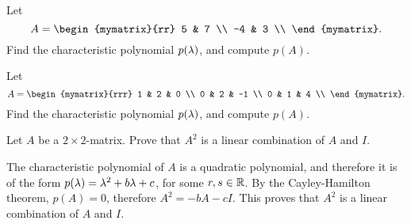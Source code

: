 \begin{enumialphparenastyle}
\begin{ex}
  Let
  \begin{equation*}
    A = \begin{mymatrix}{rr}
      5 & 7 \\
      -4 & 3 \\
    \end{mymatrix}.
  \end{equation*}
  Find the characteristic polynomial $p(\lambda)$, and compute
  $p(A)$.
\end{ex}

\begin{ex}
  Let
  \begin{equation*}
    A = \begin{mymatrix}{rrr}
      1 & 2 & 0 \\
      0 & 2 & -1 \\
      0 & 1 & 4 \\
    \end{mymatrix}.
  \end{equation*}
  Find the characteristic polynomial $p(\lambda)$, and compute
  $p(A)$.
\end{ex}

\begin{ex}
  Let $A$ be a $2\times 2$-matrix. Prove that $A^2$ is a linear
  combination of $A$ and $I$. 
  \begin{sol}
    The characteristic polynomial of $A$ is a quadratic polynomial,
    and therefore it is of the form
    $p(\lambda) = \lambda^2 + b\lambda + c$, for some
    $r,s\in\mathbb{R}$. By the Cayley-Hamilton theorem, $p(A)=0$, therefore
    $A^2 = -bA - cI$. This proves that $A^2$ is a linear combination
    of $A$ and $I$.
  \end{sol}
\end{ex}

\end{enumialphparenastyle}
